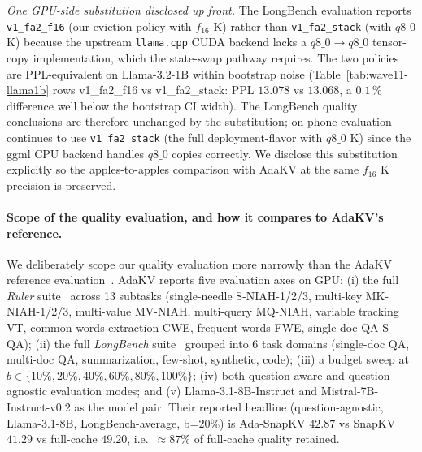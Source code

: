 \documentclass[sigconf, anonymous=false, screen=true]{acmart}
\begin{document}
\noindent\emph{One GPU-side substitution disclosed up front.} The LongBench evaluation reports \texttt{v1\_fa2\_f16} (our eviction policy with $f_{16}$ K) rather than \texttt{v1\_fa2\_stack} (with $q8\_0$ K) because the upstream \texttt{llama.cpp} CUDA backend lacks a $q8\_0 \to q8\_0$ tensor-copy implementation, which the state-swap pathway requires. The two policies are PPL-equivalent on Llama-3.2-1B within bootstrap noise (Table~\ref{tab:wave11-llama1b} rows v1\_fa2\_f16 vs v1\_fa2\_stack: PPL $13.078$ vs $13.068$, a $0.1\,\%$ difference well below the bootstrap CI width). The LongBench quality conclusions are therefore unchanged by the substitution; on-phone evaluation continues to use \texttt{v1\_fa2\_stack} (the full deployment-flavor with $q8\_0$ K) since the ggml CPU backend handles $q8\_0$ copies correctly. We disclose this substitution explicitly so the apples-to-apples comparison with AdaKV at the same $f_{16}$ K precision is preserved.

\paragraph{Scope of the quality evaluation, and how it compares to AdaKV's reference.}
We deliberately scope our quality evaluation more narrowly than the AdaKV reference evaluation~\cite{feng2025adakv}. AdaKV reports five evaluation axes on GPU: (i) the full \emph{Ruler} suite~\cite{hsieh2024ruler} across 13 subtasks (single-needle S-NIAH-1/2/3, multi-key MK-NIAH-1/2/3, multi-value MV-NIAH, multi-query MQ-NIAH, variable tracking VT, common-words extraction CWE, frequent-words FWE, single-doc QA S-QA); (ii) the full \emph{LongBench} suite~\cite{bai2023longbench} grouped into 6 task domains (single-doc QA, multi-doc QA, summarization, few-shot, synthetic, code); (iii) a budget sweep at $b \in \{10\%, 20\%, 40\%, 60\%, 80\%, 100\%\}$; (iv) both question-aware and question-agnostic evaluation modes; and (v) Llama-3.1-8B-Instruct and Mistral-7B-Instruct-v0.2 as the model pair. Their reported headline (question-agnostic, Llama-3.1-8B, LongBench-average, b=20\%) is Ada-SnapKV $42.87$ vs SnapKV $41.29$ vs full-cache $49.20$, i.e.\ $\approx 87\%$ of full-cache quality retained.
\end{document}
